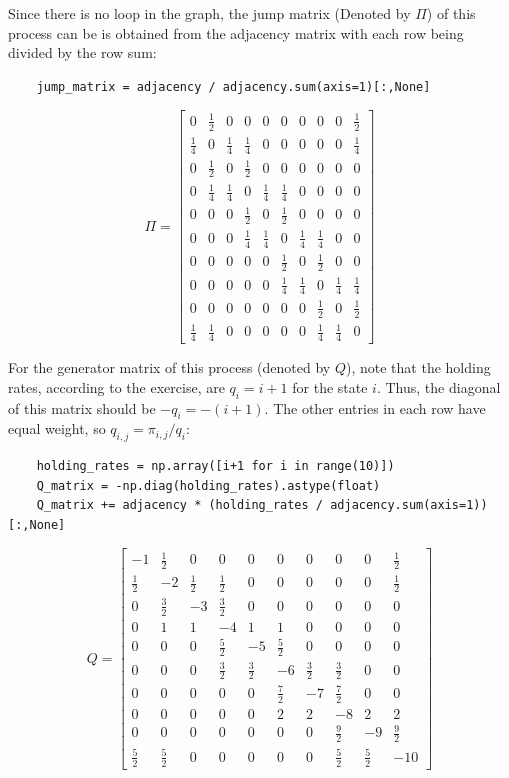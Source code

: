 Since there is no loop in the graph, the jump matrix (Denoted by $\Pi$) of this process can be is obtained from the adjacency matrix with each row being divided by the row sum:
\begin{verbatim}
    jump_matrix = adjacency / adjacency.sum(axis=1)[:,None]
\end{verbatim}
\[ \Pi = \left[\begin{matrix}0 & \frac{1}{2} & 0 & 0 & 0 & 0 & 0 & 0 & 0 & \frac{1}{2}\\\frac{1}{4} & 0 & \frac{1}{4} & \frac{1}{4} & 0 & 0 & 0 & 0 & 0 & \frac{1}{4}\\0 & \frac{1}{2} & 0 & \frac{1}{2} & 0 & 0 & 0 & 0 & 0 & 0\\0 & \frac{1}{4} & \frac{1}{4} & 0 & \frac{1}{4} & \frac{1}{4} & 0 & 0 & 0 & 0\\0 & 0 & 0 & \frac{1}{2} & 0 & \frac{1}{2} & 0 & 0 & 0 & 0\\0 & 0 & 0 & \frac{1}{4} & \frac{1}{4} & 0 & \frac{1}{4} & \frac{1}{4} & 0 & 0\\0 & 0 & 0 & 0 & 0 & \frac{1}{2} & 0 & \frac{1}{2} & 0 & 0\\0 & 0 & 0 & 0 & 0 & \frac{1}{4} & \frac{1}{4} & 0 & \frac{1}{4} & \frac{1}{4}\\0 & 0 & 0 & 0 & 0 & 0 & 0 & \frac{1}{2} & 0 & \frac{1}{2}\\\frac{1}{4} & \frac{1}{4} & 0 & 0 & 0 & 0 & 0 & \frac{1}{4} & \frac{1}{4} & 0\end{matrix}\right]
\]

For the generator matrix of this process (denoted by $Q$), note that the holding rates, according to the exercise, are $q_i = i+1$ for the state $i$. Thus, the diagonal of this matrix should be $-q_i = -(i+1)$. The other entries in each row have equal weight, so $q_{i,j} = \pi_{i,j}/q_i$:
\begin{verbatim}
    holding_rates = np.array([i+1 for i in range(10)])
    Q_matrix = -np.diag(holding_rates).astype(float)
    Q_matrix += adjacency * (holding_rates / adjacency.sum(axis=1))[:,None]
\end{verbatim}
\[ Q = \left[\begin{matrix}-1 & \frac{1}{2} & 0 & 0 & 0 & 0 & 0 & 0 & 0 & \frac{1}{2}\\\frac{1}{2} & -2 & \frac{1}{2} & \frac{1}{2} & 0 & 0 & 0 & 0 & 0 & \frac{1}{2}\\0 & \frac{3}{2} & -3 & \frac{3}{2} & 0 & 0 & 0 & 0 & 0 & 0\\0 & 1 & 1 & -4 & 1 & 1 & 0 & 0 & 0 & 0\\0 & 0 & 0 & \frac{5}{2} & -5 & \frac{5}{2} & 0 & 0 & 0 & 0\\0 & 0 & 0 & \frac{3}{2} & \frac{3}{2} & -6 & \frac{3}{2} & \frac{3}{2} & 0 & 0\\0 & 0 & 0 & 0 & 0 & \frac{7}{2} & -7 & \frac{7}{2} & 0 & 0\\0 & 0 & 0 & 0 & 0 & 2 & 2 & -8 & 2 & 2\\0 & 0 & 0 & 0 & 0 & 0 & 0 & \frac{9}{2} & -9 & \frac{9}{2}\\\frac{5}{2} & \frac{5}{2} & 0 & 0 & 0 & 0 & 0 & \frac{5}{2} & \frac{5}{2} & -10\end{matrix}\right]
\]

